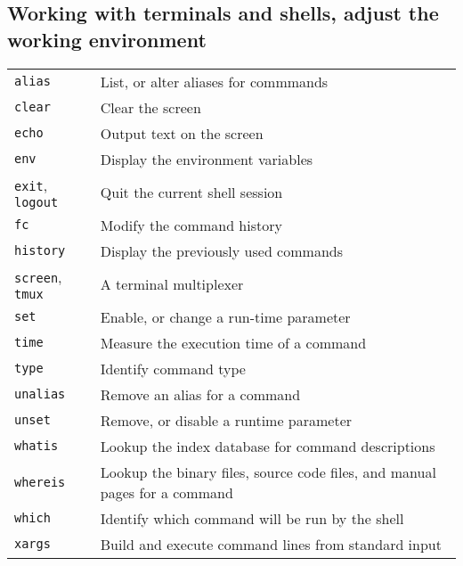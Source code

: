 \documentclass[10pt]{article}
\begin{document}
\begin{multicols}{2}
\section{Working with terminals and shells, adjust the working environment}
\begin{tabular}{ p{2.5cm} p{8.5cm} }
  \hline
  \texttt{alias} & List, or alter aliases for commmands \\
  \rowcolor{Gray}
  \texttt{clear} & Clear the screen \\
  \texttt{echo} & Output text on the screen \\
  \rowcolor{Gray}
  \texttt{env} & Display the environment variables \\
  \texttt{exit}, \texttt{logout} & Quit the current shell session \\
  \rowcolor{Gray}
  \texttt{fc} & Modify the command history \\
  \texttt{history} & Display the previously used commands \\
  \rowcolor{Gray}
  \texttt{screen}, \texttt{tmux} & A terminal multiplexer \\
  \texttt{set} & Enable, or change a run-time parameter \\
  \rowcolor{Gray}
  \texttt{time} & Measure the execution time of a command \\
  \texttt{type} & Identify command type \\
  \rowcolor{Gray}
  \texttt{unalias} & Remove an alias for a command \\
  \texttt{unset} & Remove, or disable a runtime parameter \\
  \rowcolor{Gray}
  \texttt{whatis} & Lookup the index database for command descriptions \\
  \texttt{whereis} & Lookup the binary files, source code files, and manual pages for a command \\
  \rowcolor{Gray}
  \texttt{which} & Identify which command will be run by the shell\\
  \texttt{xargs} & Build and execute command lines from standard input \\
  \hline
\end{tabular}

\columnbreak


\end{multicols}
\end{document}
